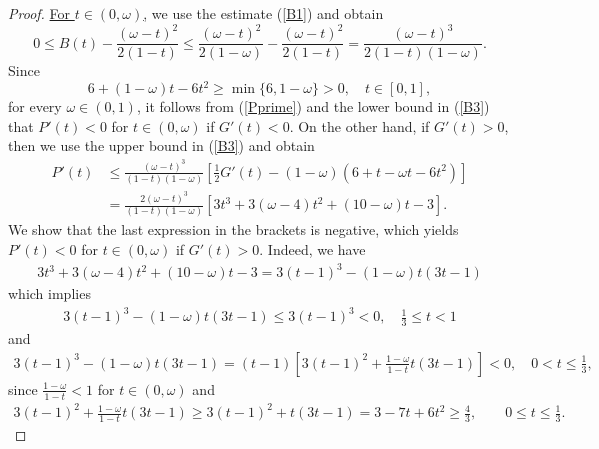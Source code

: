 \documentclass[12pt,reqno]{amsart}
\numberwithin{equation}{section}
\numberwithin{figure}{section}
\begin{document}
\begin{proof}
\underline{For $t\in (0,\omega)$,} we use the estimate (\ref{B1})  and obtain 
		\begin{equation}\label{B3}
		0 \leq  B(t) - \frac{(\omega-t)^2}{2(1-t)} \leq \frac{(\omega -t)^2}{2(1-\omega)} - \frac{(\omega-t)^2}{2(1-t)} = \frac{(\omega-t)^3}{2(1-t)(1-\omega)}.  
		\end{equation}
Since 
$$
6 + (1-\omega) t - 6t^2 \geq \min\{ 6, 1-\omega\} > 0, \quad  t \in [0,1],
$$ 
for every $\omega \in (0,1)$, it follows from (\ref{Pprime}) and the lower bound in (\ref{B3}) that $P'(t) < 0$ for $t \in (0,\omega)$ if $G'(t) < 0$. 
On the other hand, if $G'(t) > 0$, then we use the upper bound in (\ref{B3}) and obtain 
\begin{align*}
P'(t) &\leq \frac{(\omega-t)^3}{(1-t)(1-\omega)} \left[ \frac{1}{2} G'(t) - (1-\omega)(6+t-\omega t - 6t^2)  \right] \\
&= \frac{2 (\omega-t)^3}{(1-t)(1-\omega)} \left[ 3 t^3 + 3 (\omega - 4) t^2 + (10-\omega) t - 3 \right].
\end{align*}
We show that the last expression in the brackets is negative, which yields 
$P'(t) < 0$ for $t \in (0,\omega)$ if $G'(t) > 0$. Indeed, we have 
\begin{align*}
3 t^3 + 3 (\omega - 4) t^2 + (10-\omega) t - 3 = 3(t-1)^3 - (1-\omega) t (3t - 1)
\end{align*}
which implies 
\begin{align*}
3(t-1)^3 - (1-\omega) t (3t - 1) \leq 3 (t-1)^3 < 0, \quad  \frac{1}{3} \leq t < 1
\end{align*}
and 
\begin{align*}
3(t-1)^3 - (1-\omega) t (3t - 1) = (t-1) \left[ 3 (t-1)^2 + \frac{1-\omega}{1-t} t (3t - 1) \right] < 0, \quad  0 < t \leq \frac{1}{3}, 
\end{align*}
since $\frac{1-\omega}{1-t} < 1$ for $t \in (0,\omega)$ and 
\begin{align*}
 3 (t-1)^2 + \frac{1-\omega}{1-t} t (3t - 1) \geq 
  3 (t-1)^2 + t (3t - 1) = 3 - 7t + 6 t^2 \geq \frac{4}{3}, \qquad 0 \leq t \leq \frac{1}{3}.
\end{align*}


\end{proof}
\end{document}
